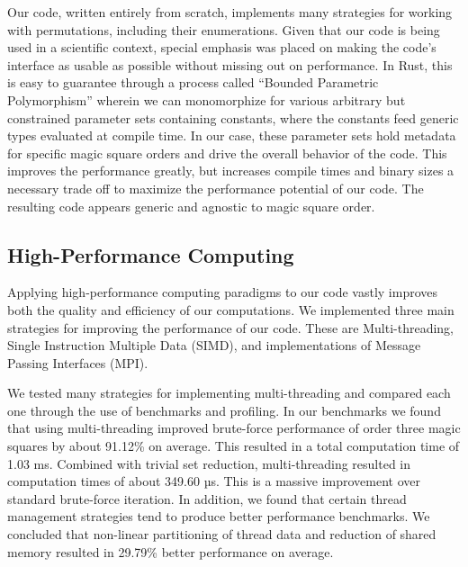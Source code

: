 \documentclass{rhumj_new}
\begin{document}
Our code, written entirely from scratch, implements many strategies for working with
permutations, including their enumerations. Given that our code is being used in a scientific
context, special emphasis was placed on making the code's interface as usable as possible without
missing out on performance. In Rust, this is easy to guarantee through a process called ``Bounded
Parametric Polymorphism'' wherein we can monomorphize for various arbitrary but constrained
parameter sets containing constants, where the constants feed generic types evaluated at compile
time\cite{Cardelli}. In our case, these parameter sets hold metadata for specific magic square orders and
drive the overall behavior of the code. This improves the performance greatly, but increases
compile times and binary sizes \textemdash{} a necessary trade off to maximize the performance
potential
of our code. The resulting code appears generic and agnostic to magic square order.

\subsection{High-Performance Computing}

Applying high-performance computing paradigms to our code vastly improves both the quality and
efficiency of our computations. We implemented three main strategies for improving the performance
of our code. These are Multi-threading, Single Instruction Multiple Data (SIMD), and
implementations of Message Passing Interfaces (MPI).

We tested many strategies for implementing multi-threading and compared each one through the
use of benchmarks and profiling. In our benchmarks we found that using multi-threading improved
brute-force performance of order three magic squares by about 91.12\% on average. This resulted in
a total computation time of 1.03 ms. Combined with trivial set reduction, multi-threading resulted
in computation times of about 349.60 µs. This is a massive improvement over standard brute-force
iteration. In addition, we found that certain thread management strategies tend to produce better
performance benchmarks. We concluded that non-linear partitioning of thread data and reduction of
shared memory resulted in 29.79\% better performance on average.
\end{document}
